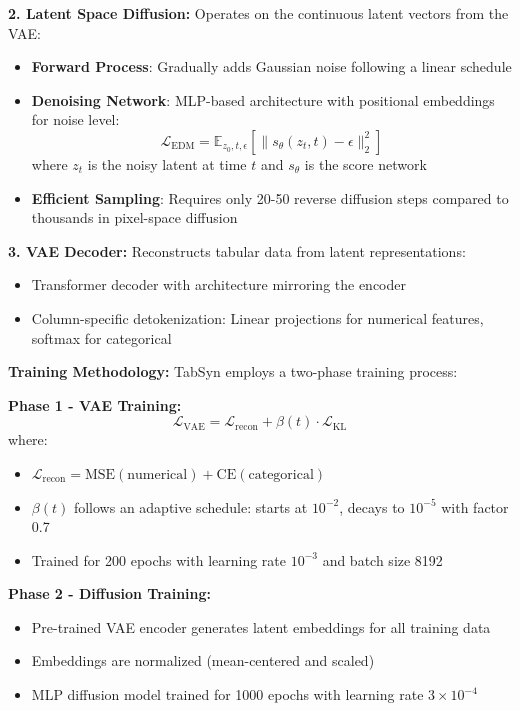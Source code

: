\documentclass[conference]{IEEEtran}
\begin{document}
\textbf{2. Latent Space Diffusion:} Operates on the continuous latent vectors from the VAE:
\begin{itemize}
    \item \textbf{Forward Process}: Gradually adds Gaussian noise following a linear schedule
    \item \textbf{Denoising Network}: MLP-based architecture with positional embeddings for noise level:
    \begin{equation}
    \mathcal{L}_{\text{EDM}} = \mathbb{E}_{z_0, t, \epsilon} \left[ \|s_\theta(z_t, t) - \epsilon\|_2^2 \right]
    \end{equation}
    where $z_t$ is the noisy latent at time $t$ and $s_\theta$ is the score network
    \item \textbf{Efficient Sampling}: Requires only 20-50 reverse diffusion steps compared to thousands in pixel-space diffusion
\end{itemize}

\textbf{3. VAE Decoder:} Reconstructs tabular data from latent representations:
\begin{itemize}
    \item Transformer decoder with architecture mirroring the encoder
    \item Column-specific detokenization: Linear projections for numerical features, softmax for categorical
\end{itemize}

\textbf{Training Methodology:} TabSyn employs a two-phase training process:

\textbf{Phase 1 - VAE Training:}
\begin{equation}
\mathcal{L}_{\text{VAE}} = \mathcal{L}_{\text{recon}} + \beta(t) \cdot \mathcal{L}_{\text{KL}}
\end{equation}
where:
\begin{itemize}
    \item $\mathcal{L}_{\text{recon}} = \text{MSE}(\text{numerical}) + \text{CE}(\text{categorical})$
    \item $\beta(t)$ follows an adaptive schedule: starts at $10^{-2}$, decays to $10^{-5}$ with factor 0.7
    \item Trained for 200 epochs with learning rate $10^{-3}$ and batch size 8192
\end{itemize}

\textbf{Phase 2 - Diffusion Training:}
\begin{itemize}
    \item Pre-trained VAE encoder generates latent embeddings for all training data
    \item Embeddings are normalized (mean-centered and scaled)
    \item MLP diffusion model trained for 1000 epochs with learning rate $3 \times 10^{-4}$
\end{itemize}
\end{document}
